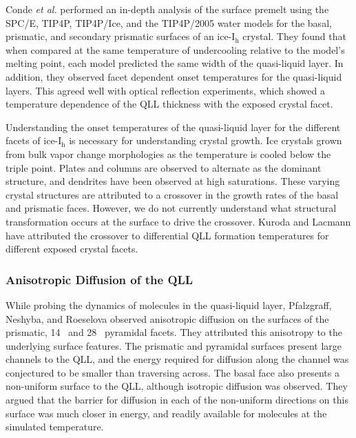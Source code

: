 Conde \textit{et al.} performed an in-depth analysis of the surface
premelt using the SPC/E, TIP4P, TIP4P/Ice, and the TIP4P/2005 water
models for the basal, prismatic, and secondary prismatic surfaces of
an ice-I$_\mathrm{h}$ crystal.\cite{Conde2008} They found that when
compared at the same temperature of undercooling relative to the
model's melting point, each model predicted the same width of the
quasi-liquid layer. In addition, they observed facet dependent onset
temperatures for the quasi-liquid layers. This agreed well with 
optical reflection experiments, which showed a temperature
dependence of the QLL thickness with the exposed
crystal facet.\cite{Elbaum1993} 

Understanding the onset temperatures of the quasi-liquid layer for the
different facets of ice-I$_\mathrm{h}$ is necessary for understanding
crystal growth.  Ice crystals grown from bulk vapor change
morphologies as the temperature is cooled below the triple
point. Plates and columns are observed to alternate as the dominant
structure, and dendrites have been observed at high
saturations.\cite{Libbrecht2005} These varying crystal structures are
attributed to a crossover in the growth rates of the basal and
prismatic faces. However, we do not currently understand what
structural transformation occurs at the surface to drive the
crossover.\cite{Libbrecht2005,Furukawa2007,Liu1996} Kuroda and Lacmann
have attributed the crossover to differential QLL formation
temperatures for different exposed crystal facets.\cite{Kuroda1982}



\subsubsection{Anisotropic Diffusion of the QLL}
While probing the dynamics of molecules in the quasi-liquid layer,
Pfalzgraff, Neshyba, and Roeselova observed anisotropic diffusion on
the surfaces of the prismatic, 14\degree~ and 28\degree~ pyramidal
facets.\cite{Pfalzgraff2011} They attributed this anisotropy to the
underlying surface features. The prismatic and pyramidal surfaces
present large channels to the QLL, and the energy required for
diffusion along the channel was conjectured to be smaller than
traversing across. The basal face also presents a non-uniform surface
to the QLL, although isotropic diffusion was observed. They argued
that the barrier for diffusion in each of the non-uniform directions
on this surface was much closer in energy, and readily available for
molecules at the simulated temperature.

